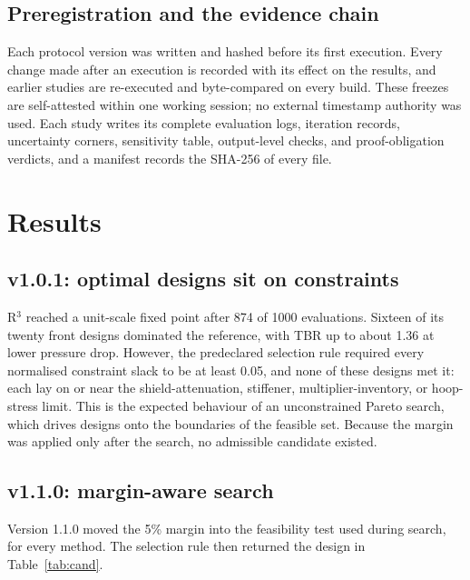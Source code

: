 \documentclass[11pt]{article}
\begin{document}
\subsection{Preregistration and the evidence chain}

Each protocol version was written and hashed before its first execution. Every change made
after an execution is recorded with its effect on the results, and earlier studies are
re-executed and byte-compared on every build. These freezes are self-attested within one
working session; no external timestamp authority was used. Each study writes its complete
evaluation logs, iteration records, uncertainty corners, sensitivity table, output-level
checks, and proof-obligation verdicts, and a manifest records the SHA-256 of every file.

\section{Results}

\subsection{v1.0.1: optimal designs sit on constraints}

R$^3$ reached a unit-scale fixed point after 874 of 1000 evaluations. Sixteen of its twenty
front designs dominated the reference, with TBR up to about 1.36 at lower pressure drop.
However, the predeclared selection rule required every normalised constraint slack to be at
least 0.05, and none of these designs met it: each lay on or near the shield-attenuation,
stiffener, multiplier-inventory, or hoop-stress limit. This is the expected behaviour of an
unconstrained Pareto search, which drives designs onto the boundaries of the feasible set.
Because the margin was applied only after the search, no admissible candidate existed.

\subsection{v1.1.0: margin-aware search}

Version 1.1.0 moved the 5\% margin into the feasibility test used during search, for every method.
The selection rule then returned the design in Table~\ref{tab:cand}.
\end{document}
